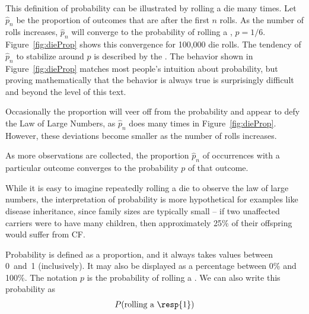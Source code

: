 \begin{doublespace}
This definition of probability can be illustrated by rolling a die many times. Let $\hat{p}_n$ be the proportion of outcomes that are  after the first $n$ rolls. As the number of rolls increases, $\hat{p}_n$ will converge to the probability of rolling a , $p = 1/6$. Figure~\ref{fig:dieProp} shows this convergence for 100,000 die rolls. The tendency of $\hat{p}_n$ to stabilize around $p$ is described by the . The behavior shown in Figure~\ref{fig:dieProp} matches most people's intuition about probability, but proving mathematically that the behavior is always true is surprisingly difficult and beyond the level of this text.

Occasionally the proportion will veer off from the probability and appear to defy the Law of Large Numbers, as $\hat{p}_n$ does many times in Figure~\ref{fig:dieProp}. However, these deviations become smaller as the number of rolls increases.

\begin{termBox}{
As more observations are collected, the proportion $\hat{p}_n$ of occurrences with a particular outcome converges to the probability $p$ of that outcome.}
\end{termBox}


While it is easy to imagine repeatedly rolling a die to observe the law of large numbers, the interpretation of probability is more hypothetical for examples like disease inheritance, since family sizes are typically small -- if two unaffected carriers were to have many children, then approximately 25\% of their offspring would suffer from CF.

Probability is defined as a proportion, and it always takes values between 0~and~1 (inclusively). It may also be displayed as a percentage between 0\% and 100\%. The notation $p$ is the probability of rolling a . We can also write this probability as
\begin{eqnarray*}
P(\text{rolling a \resp{1}})
\end{eqnarray*}
\end{doublespace}

